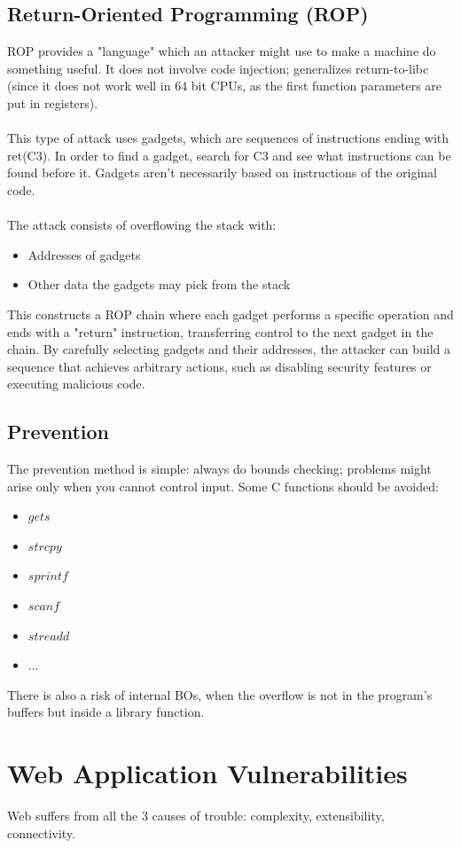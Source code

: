 \documentclass[10pt,a4paper]{report}
\begin{document}
\subsection{Return-Oriented Programming (ROP)}
ROP provides a "language" which an attacker might use to make a machine do something useful. It does not involve code injection; generalizes return-to-libc (since it does not work well in 64 bit CPUs, as the first function parameters are put in registers).\\
\\
This type of attack uses gadgets, which are sequences of instructions ending with ret(C3). In order to find a gadget, search for C3 and see what instructions can be found before it. Gadgets aren’t necessarily based on instructions of the original code.\\
\\
The attack consists of overflowing the stack with:
\begin{itemize}
\item Addresses of gadgets
\item Other data the gadgets may pick from the stack
\end{itemize}
This constructs a ROP chain where each gadget performs a specific operation and ends with a "return" instruction, transferring control to the next gadget in the chain. By carefully selecting gadgets and their addresses, the attacker can build a sequence that achieves arbitrary actions, such as disabling security features or executing malicious code.
\subsection{Prevention}
The prevention method is simple: always do bounds checking; problems might arise only when you cannot control input. Some C functions should be avoided:
\begin{itemize}
\item $gets$
\item $strcpy$
\item $sprintf$
\item $scanf$
\item $streadd$
\item ...
\end{itemize}
There is also a risk of internal BOs, when the overflow is not in the program’s buffers but inside a library function.

\section{Web Application Vulnerabilities}
Web suffers from all the 3 causes of trouble: complexity, extensibility, connectivity.
\end{document}
